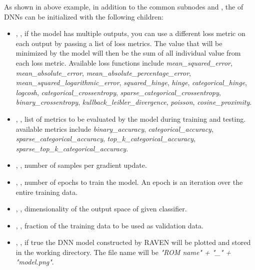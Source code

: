 As shown in above example, in addition to the common subnodes  and , the  of DNNs
can be initialized with the following children:
\begin{itemize}
  \item {}, , if the model has multiple outputs, you can use a different
    loss metric on each output by passing a list of loss metrics. The value that will be minimized by the model will then
    be the sum of all individual value from each loss metric. Available loss functions include \textit{mean\_squared\_error},
    \textit{mean\_absolute\_error}, \textit{mean\_absolute\_percentage\_error}, \textit{mean\_squared\_logarithmic\_error},
    \textit{squared\_hinge}, \textit{hinge}, \textit{categorical\_hinge}, \textit{logcosh}, \textit{categorical\_crossentropy},
    \textit{sparse\_categorical\_crossentropy}, \textit{binary\_crossentropy}, \textit{kullback\_leibler\_divergence},
    \textit{poisson}, \textit{cosine\_proximity}.
  \item {}, , list of metrics to be evaluated by
    the model during training and testing. available metrics include
    \textit{binary\_accuracy}, \textit{categorical\_accuracy}, \textit{sparse\_categorical\_accuracy},
    \textit{top\_k\_categorical\_accuracy}, \textit{sparse\_top\_k\_categorical\_accuracy}.
  \item {}, , number of samples per gradient update.
  \item {}, , number of epochs to train the model. An epoch
    is an iteration over the entire training data.
  \item {}, , dimensionality of the output space of given classifier.
  \item {}, , fraction of the training data to
    be used as validation data.
  \item {}, , if true the DNN model constructed by RAVEN will be
    plotted and stored in the working directory. The file name will be \textit{"ROM name" + "\_" + "model.png"}.

\end{itemize}
